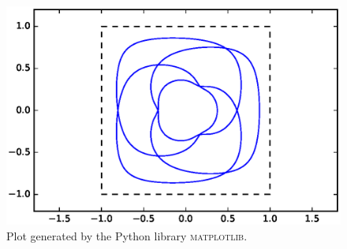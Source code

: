 \documentclass[11pt]{article}
\begin{document}
\begin{figure}[H]
\centering
\includegraphics[width=\textwidth]{discToSquare_example1}
\caption{Plot generated by the Python library \textsc{matplotlib}.}
\end{figure}
\end{document}
